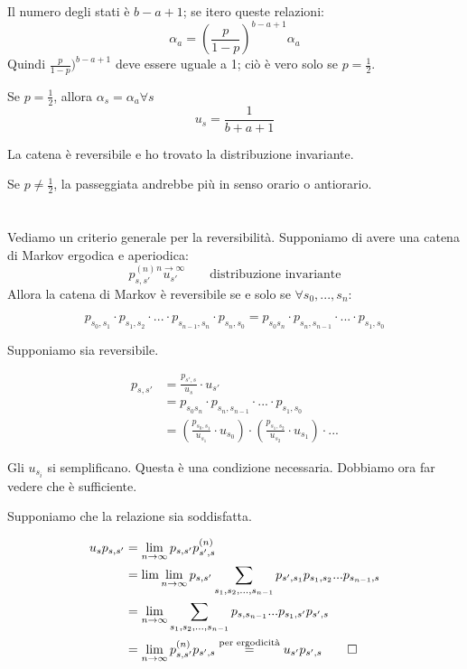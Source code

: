 \documentclass[a4paper,12pt]{book}
\begin{document}
Il numero degli stati è $ b-a+1 $; se itero queste relazioni:
$$ \alpha_a = \left(\frac{p}{1-p}\right)^{b-a+1}\alpha_a $$
Quindi $ \frac{p}{1-p})^{b-a+1} $ deve essere uguale a 1; ciò è vero solo se $ p = \frac{1}{2} $.

Se $ p = \frac{1}{2} $, allora $ \alpha_s = \alpha_a \forall s $
$$ u_s = \frac{1}{b+a+1}$$

La catena è reversibile e ho trovato la distribuzione invariante. 

Se $ p \ne \frac{1}{2} $, la passeggiata andrebbe più in senso orario o antiorario.
\\
\\
\\
Vediamo un criterio generale per la reversibilità. Supponiamo di avere una catena di Markov ergodica e aperiodica:
$$ p_{s,s'}^(n) \overset{n \to \infty}{u_{s'}} \qquad \text{distribuzione invariante} $$
Allora la catena di Markov è reversibile se e solo se $ \forall s_0, ..., s_n $:

$$ p_{s_0,s_1} \cdot p_{s_1, s_2} \cdot ... \cdot p_{s_{n-1}, s_n} \cdot p_{s_n , s_0} = p_{s_0 s_n} \cdot p_{s_n, s_{n-1}} \cdot ... \cdot p_{s_1, s_0} $$

Supponiamo sia reversibile.

\begin{align*}
	p_{s,s'} & = \frac{p_{s',s}}{u_s}\cdot u_{s'} \\
	& = p_{s_0 s_n} \cdot p_{s_n, s_{n-1}} \cdot ... \cdot p_{s_1, s_0} \\
	& = \left(\frac{p_{s_0, s_1}}{u_{s_1}}\cdot u_{s_0}\right) \cdot \left(\frac{p_{s_1, s_2}}{u_{s_2}}\cdot u_{s_1}\right) \cdot ...
\end{align*}

Gli $ u_{s_i} $ si semplificano. Questa è una condizione necessaria. Dobbiamo ora far vedere che è sufficiente. 

Supponiamo che la relazione sia soddisfatta.

\begin{align*}
	u_s p_{s,s'} & = \lim\limits_{n \to \infty} p_{s,s'}p_{s',s}^{(n)} \\
	& = \lim\lim\limits_{n \to \infty} p_{s,s'} \sum_{s_1, s_2, ..., s_{n-1}} p_{s',s_1} p_{s_1, s_2} ... p_{s_{n-1}, s} \\
	& = \lim\limits_{n \to \infty} \sum_{s_1, s_2, ..., s_{n-1}} p_{s,s_{n-1}} ... p_{s_1, s'}p_{s',s} \\
	& = \lim\limits_{n \to \infty} p_{s,s'}^{(n)} p_{s',s} \overset{\text{per ergodicità}}{=} u_{s'} p_{s',s} \qed
\end{align*}
\end{document}
